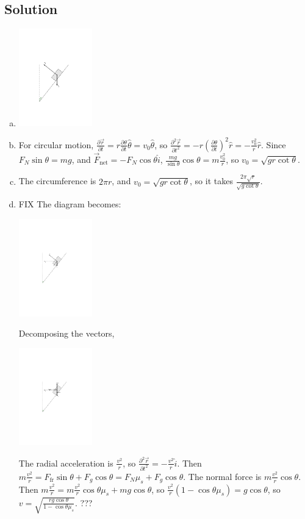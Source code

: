 \documentclass{esg8012pset}
\begin{document}
\begin{question}[Problem 2]
\subsection*{Solution}
\begin{enumerate}[a)]
  \item \hfil\includegraphics[width=0.25\textwidth]{2009-09-25_Diagram_3}\hfil
  \item For circular motion, $\frac{\partial \vec r}{\partial t} = r\frac{\partial \theta}{\partial t}\hat \theta = v_0 \hat \theta$, so $\frac{\partial^2 \vec r}{\partial t^2} = -r\left(\frac{\partial \theta}{\partial t}\right)^2\hat r = -\frac{v_0^2}{r}\hat r$.  Since $F_N\sin\theta = mg$, and $\vec F_{\text{net}} = -F_N\cos\theta\hat i$, $\frac{mg}{\sin\theta}\cos\theta = m\frac{v_0^2}{r}$, so $v_0 = \sqrt{gr\cot\theta}$.
  \item The circumference is $2\pi r$, and $v_0 = \sqrt{gr\cot\theta}$, so it takes $\frac{2\pi\sqrt{r}}{\sqrt{g\cot\theta}}$.
  \item FIX The diagram becomes: \begin{center}\includegraphics[width=0.25\textwidth]{2009-09-25_Diagram_8}\end{center}  Decomposing the vectors, \begin{center}\includegraphics[width=0.25\textwidth]{2009-09-25_Diagram_9}\end{center}  The radial acceleration is $\frac{v^2}{r}$, so $\frac{\partial^2 \vec r}{\partial t^2} = -\frac{v^2}{r}\hat i$.  Then $m\frac{v^2}{r} = F_{\text{fr}}\sin\theta + F_g\cos\theta = F_N \mu_s + F_g\cos\theta$.  The normal force is $m\frac{v^2}{r}\cos\theta$.  Then $m\frac{v^2}{r} = m\frac{v^2}{r}\cos\theta \mu_s + mg\cos\theta$, so $\frac{v^2}{r}(1 - \cos\theta \mu_s) = g\cos\theta$, so $v = \sqrt{\frac{rg\cos\theta}{1-\cos\theta\mu_s}}$. ???
\end{enumerate}


\end{question}
\end{document}
